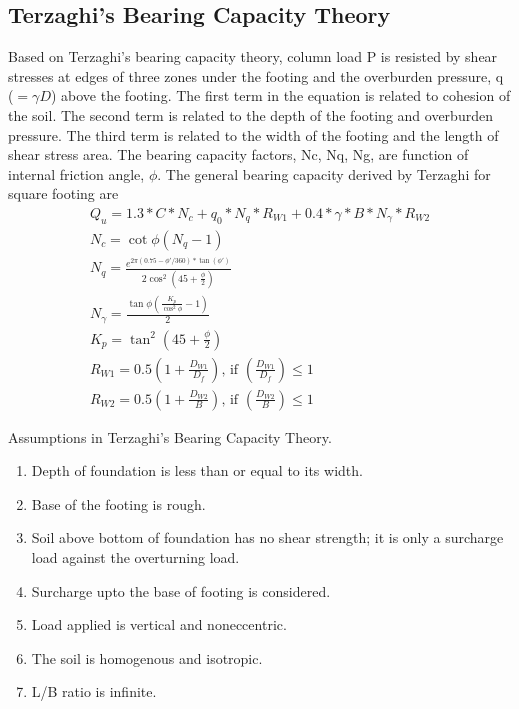 \subsection{Terzaghi’s Bearing Capacity Theory}
Based on Terzaghi’s bearing capacity theory, column load P is resisted by shear stresses at edges of three zones under the footing and the overburden pressure, q ($=\gamma D$) above the footing.  The first term in the equation is related to cohesion of the soil. The second term is related to the depth of the footing and overburden pressure. The third term is related to the width of the footing and the length of shear stress area. The bearing capacity factors, Nc, Nq, Ng, are function of internal friction angle, $\phi$.
The general bearing capacity derived by Terzaghi for square footing are
\begin{gather}
Q_u = 1.3 * C * N_c + q_0 * N_q * R_{W1} + 0.4 * {\gamma} * B * N_{\gamma} * R_{W2} \\
N_c = \cot \phi (N_q - 1)\\
N_q = \frac {e ^ {2 \pi (0.75 - \phi'/360)*\tan(\phi')} } {2 \cos ^2 (45 + \frac{\phi}{2})}\\
N_{\gamma} = \frac{\tan \phi (\frac{K_p}{\cos ^2 \phi} - 1)}{2}\\
K_p= \tan ^ 2 (45 + \frac{\phi}{2})\\
R_{W1} = 0.5 (1 +\frac{D_{W1}}{D_f}) \text{, if } (\frac{D_{W1}}{D_f})\le 1 \\
R_{W2} = 0.5 (1 +\frac{D_{W2}}{B})\text{, if } (\frac{D_{W2}}{B})\le 1
\end{gather}

Assumptions in Terzaghi’s Bearing Capacity Theory.
\begin{enumerate}
\item Depth of foundation is less than or equal to its width.
\item Base of the footing is rough.
\item Soil above bottom of foundation has no shear strength; it is only a surcharge load against the overturning load.
\item Surcharge upto the base of footing is considered.
\item Load applied is vertical and non\-eccentric.
\item The soil is homogenous and isotropic.
\item L/B ratio is infinite.
\end{enumerate}

